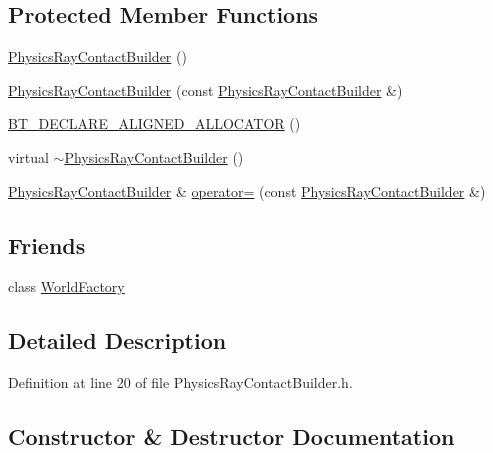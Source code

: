 \subsection*{Protected Member Functions}
\begin{DoxyCompactItemize}
\item 
\mbox{\hyperlink{classnjli_1_1_physics_ray_contact_builder_a25c1c5ae3477bfde44b1faf6c3bbb837}{Physics\+Ray\+Contact\+Builder}} ()
\item 
\mbox{\hyperlink{classnjli_1_1_physics_ray_contact_builder_aeb1ccf771870bce935fb22296535b9a1}{Physics\+Ray\+Contact\+Builder}} (const \mbox{\hyperlink{classnjli_1_1_physics_ray_contact_builder}{Physics\+Ray\+Contact\+Builder}} \&)
\item 
\mbox{\hyperlink{classnjli_1_1_physics_ray_contact_builder_a84ad29c8600360cc0739cd7715045dfe}{B\+T\+\_\+\+D\+E\+C\+L\+A\+R\+E\+\_\+\+A\+L\+I\+G\+N\+E\+D\+\_\+\+A\+L\+L\+O\+C\+A\+T\+OR}} ()
\item 
virtual \mbox{\hyperlink{classnjli_1_1_physics_ray_contact_builder_ae9bc39b2acc2aa75d1bf4052186936d6}{$\sim$\+Physics\+Ray\+Contact\+Builder}} ()
\item 
\mbox{\hyperlink{classnjli_1_1_physics_ray_contact_builder}{Physics\+Ray\+Contact\+Builder}} \& \mbox{\hyperlink{classnjli_1_1_physics_ray_contact_builder_acc899f63fafc4de380b1f3b829d3babe}{operator=}} (const \mbox{\hyperlink{classnjli_1_1_physics_ray_contact_builder}{Physics\+Ray\+Contact\+Builder}} \&)
\end{DoxyCompactItemize}
\subsection*{Friends}
\begin{DoxyCompactItemize}
\item 
class \mbox{\hyperlink{classnjli_1_1_physics_ray_contact_builder_acb96ebb09abe8f2a37a915a842babfac}{World\+Factory}}
\end{DoxyCompactItemize}


\subsection{Detailed Description}


Definition at line 20 of file Physics\+Ray\+Contact\+Builder.\+h.



\subsection{Constructor \& Destructor Documentation}
\mbox{\label{classnjli_1_1_physics_ray_contact_builder_a25c1c5ae3477bfde44b1faf6c3bbb837}} 
